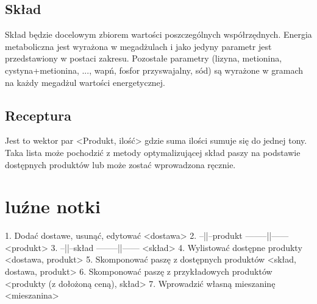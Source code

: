\documentclass[shortabstract]{iithesis}
\begin{document}
\section{Skład}

Skład będzie docelowym zbiorem wartości poszczególnych współrzędnych. Energia metaboliczna jest wyrażona w megadżulach i jako jedyny parametr jest przedstawiony w postaci zakresu. Pozostałe parametry (lizyna, metionina, cystyna+metionina, ..., wapń, fosfor przyswajalny, sód) są wyrażone w gramach na każdy megadżul wartości energetycznej.


\section{Receptura}

Jest to wektor par <Produkt, ilość> gdzie suma ilości sumuje się do jednej tony. Taka lista może pochodzić z metody optymalizującej skład paszy na podstawie dostępnych produktów lub może zostać wprowadzona ręcznie. 

\chapter{luźne notki}

1. Dodać dostawe, usunąć, edytować <dostawa>
2. --||--produkt  --------||------ <produkt>
3. --||--skład  --------||------ <skład>
4. Wylistować dostępne produkty <dostawa, produkt>
5. Skomponować paszę z dostępnych produktów <skład, dostawa, produkt>
6. Skomponować paszę z przykładowych produktów <produkty (z dołożoną ceną), skład>
7. Wprowadzić własną mieszaninę <mieszanina> 






\end{document}
